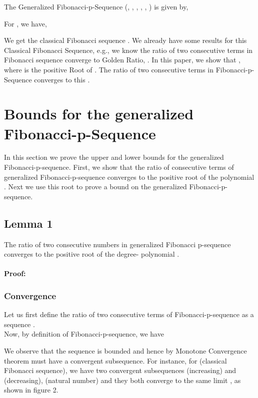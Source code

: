 \documentclass{ijcsa}
\begin{document}
\par The Generalized Fibonacci-p-Sequence (\cite{horadam61}, \cite{basin63}, \cite{hoggatt72}, \cite{atkins87}, \cite{hendel94}, \cite{sun92}) is given by, 



\par For , we have,

\par We get the classical Fibonacci sequence . We already have some results for this
Classical Fibonacci Sequence, e.g., we know the ratio of two consecutive terms in Fibonacci sequence converge to Golden Ratio,  
. 
In this paper, we show that , where  is the positive Root of . The ratio of two consecutive terms in Fibonacci-p-Sequence converges to this .

\section{Bounds for the generalized Fibonacci-p-Sequence}
In this section we prove the upper and lower bounds for the generalized Fibonacci-p-sequence. First, we show that the ratio of 
consecutive terms of generalized Fibonacci-p-sequence converges to the positive root of the polynomial . Next 
we use this root to prove a bound on the generalized Fibonacci-p-sequence.

\subsection{Lemma 1}
\label{sec:Lemma1}
\par The ratio of two consecutive numbers in generalized Fibonacci p-sequence converges to the positive root of 
the degree- polynomial .

\paragraph{Proof:}
\label{sec:Proof}

\subsubsection*{Convergence}
Let us first define the ratio of two consecutive terms of Fibonacci-p-sequence as a sequence . \\
Now, by definition of Fibonacci-p-sequence, we have


We observe that the sequence  is bounded and hence by Monotone Convergence theorem must 
have a convergent subsequence. For instance, for  (classical Fibonacci sequence), we have two convergent subsequences
 (increasing) and  (decreasing),  (natural number) and they both converge to the same limit
 \cite{craw00}, as shown in figure 2.  
\end{document}
